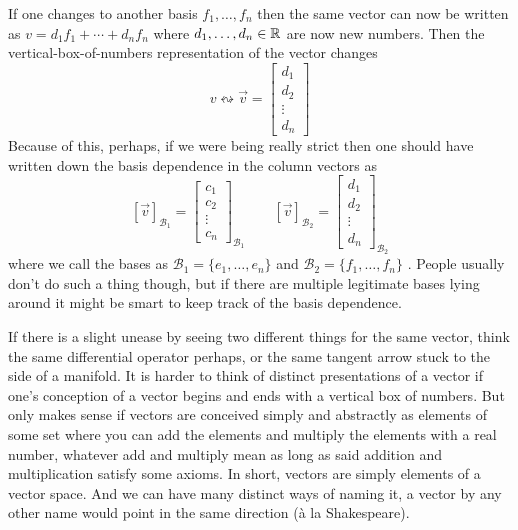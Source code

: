 \documentclass[12pt]{amsart}
\begin{document}
If one changes to another basis  $f_1, \ldots, f_n$ then the same vector can now be written as $v = d_1f_1 + \cdots + d_n f_n$ where $d_1, \ldots, d_n \in \mathbb{R}$ are now new numbers. Then the vertical-box-of-numbers representation of the vector changes
\begin{equation}\label{eq:fbasisrep}
	v \leftrightsquigarrow \vec{v} =  \begin{bmatrix} d_1\\ d_2\\ \vdots \\ d_n \end{bmatrix}
\end{equation}
Because of this, perhaps, if we were being really strict then one should have written down the basis dependence in the column vectors as
\[
	[\vec{v}]_{\mathcal{B}_1} = \begin{bmatrix} c_1\\ c_2\\ \vdots\\ c_n \end{bmatrix}_{\mathcal{B}_1} \qquad 	[\vec{v}]_{\mathcal{B}_2} = \begin{bmatrix} d_1\\ d_2\\ \vdots\\ d_n \end{bmatrix}_{\mathcal{B}_2}
\]
where we call the bases as $\mathcal{B}_1 = \{e_1, \ldots, e_n\}$ and $\mathcal{B}_2 = \{f_1, \ldots, f_n\}$ . People usually don't do such a thing though, but if there are multiple legitimate bases lying around it might be smart to keep track of the basis dependence.
\begin{remark}
If there is a slight unease by seeing two different things for the same vector,  think the same differential operator perhaps, or the same tangent arrow stuck to the side of a manifold. It is harder to think of distinct presentations of a vector if one's conception of a vector begins and ends with a vertical box of numbers. But only makes sense if vectors are conceived simply and abstractly as elements of some set where you can add the elements and multiply the elements with a real number, whatever add and multiply mean as long as said addition and multiplication satisfy some axioms. In short, vectors are simply elements of a vector space. And we can have many distinct ways of naming it, a vector by any other name would point in the same direction (\`{a} l{a}  Shakespeare).
\end{remark}
\end{document}
